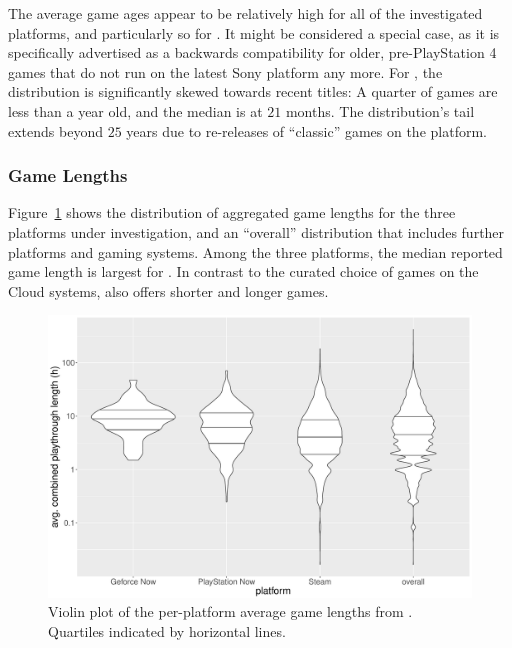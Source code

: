 The average
game ages appear to be relatively high for all of the investigated
platforms, and particularly so for \psnow. It might be considered a
special case, as it is specifically advertised as a backwards
compatibility for older, pre-PlayStation 4 games that do not run on the
latest Sony platform any more. For \steam, the distribution is
significantly skewed towards recent titles: A quarter of games are less
than a year old, and the median is at $21$ months. The
distribution's tail extends beyond $25$ years due to re-releases
of ``classic'' games on the platform.


\subsubsection{Game Lengths}
Figure~\ref{fig:gamelengths-violin} shows the distribution of aggregated
game lengths for the three platforms under investigation, and an
``overall'' distribution that includes further platforms and gaming
systems. Among the three platforms, the median reported game
length %
is largest for \gfnow. In
contrast to the curated choice of games on the Cloud systems, \steam
also offers shorter and longer games.


\begin{figure}[!t]
	\centering
	\includegraphics[width=1.0\columnwidth]{images/gamelengths-by-platform-violin.pdf}
	\caption{Violin plot of the per-platform average game lengths from \hltb. Quartiles indicated by horizontal lines.}
\label{fig:gamelengths-violin}
\end{figure}



